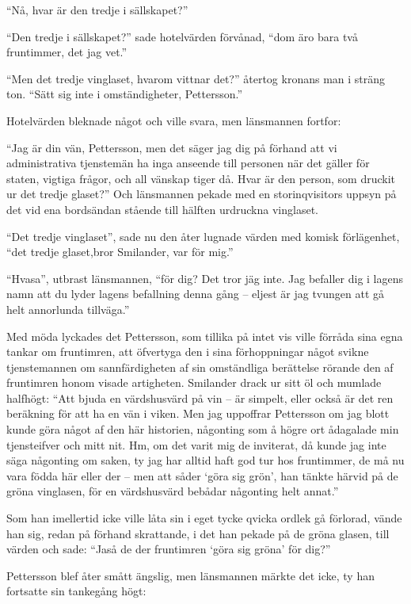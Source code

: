 ``Nå, hvar är den tredje i sällskapet?''

``Den tredje i sällskapet?'' sade hotelvärden förvånad, ``dom äro bara
två fruntimmer, det jag vet.''

``Men det tredje vinglaset, hvarom vittnar det?'' återtog kronans man i
sträng ton. ``Sätt sig inte i omständigheter, Pettersson.''

Hotelvärden bleknade något och ville svara, men länsmannen fortfor:

``Jag är din vän, Pettersson, men det säger jag dig på förhand att vi
administrativa tjenstemän ha inga anseende till personen när det gäller
för staten, vigtiga frågor, och all vänskap tiger då. Hvar är den
person, som druckit ur det tredje glaset?'' Och länsmannen pekade med en
storinqvisitors uppsyn på det vid ena bordsändan stående till hälften
urdruckna vinglaset.

``Det tredje vinglaset'', sade nu den åter lugnade värden med komisk
förlägenhet, ``det tredje glaset,bror Smilander, var för mig.''

``Hvasa'', utbrast länsmannen, ``för dig? Det tror jäg inte. Jag
befaller dig i lagens namn att du lyder lagens befallning denna gång --
eljest är jag tvungen att gå helt annorlunda tillväga.''

Med möda lyckades det Pettersson, som tillika på intet vis ville förråda
sina egna tankar om fruntimren, att öfvertyga den i sina förhoppningar
något svikne tjenstemannen om sannfärdigheten af sin omständliga
berättelse rörande den af fruntimren honom visade artigheten. Smilander
drack ur sitt öl och mumlade halfhögt: ``Att bjuda en värdshusvärd på
vin -- är simpelt, eller också är det ren beräkning för att ha en vän i
viken. Men jag uppoffrar Pettersson om jag blott kunde göra något af den
här historien, någonting som å högre ort ådagalade min tjensteifver och
mitt nit. Hm, om det varit mig de inviterat, då kunde jag inte säga
någonting om saken, ty jag har alltid haft god tur hos fruntimmer, de må
nu vara födda här eller der -- men att såder `göra sig grön', han tänkte
härvid på de gröna vinglasen, för en värdshusvärd bebådar någonting helt
annat.''

Som han imellertid icke ville låta sin i eget tycke qvicka ordlek gå
förlorad, vände han sig, redan på förhand skrattande, i det han pekade
på de gröna glasen, till värden och sade: ``Jaså de der fruntimren `göra
sig gröna' för dig?''

Pettersson blef åter smått ängslig, men länsmannen märkte det icke, ty
han fortsatte sin tankegång högt:

